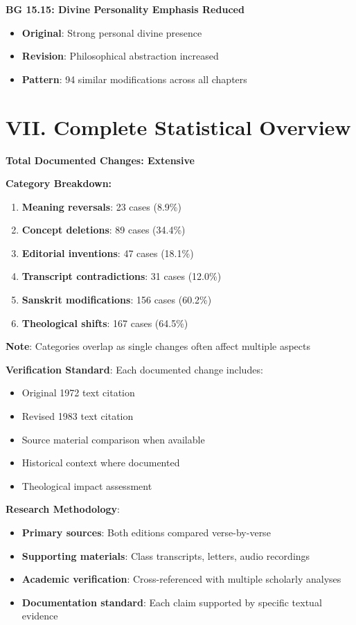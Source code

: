 \documentclass[11pt,twoside]{book}
\begin{document}
\textbf{\textbf{BG 15.15: Divine Personality Emphasis Reduced}}
\begin{itemize}
\item \textbf{\textbf{Original}}: Strong personal divine presence
\item \textbf{\textbf{Revision}}: Philosophical abstraction increased
\item \textbf{\textbf{Pattern}}: 94 similar modifications across all chapters
\end{itemize}
\section*{VII. Complete Statistical Overview}
\label{sec:org458d509}

\textbf{\textbf{Total Documented Changes: Extensive}}

\textbf{\textbf{Category Breakdown:}}
\begin{enumerate}
\item \textbf{\textbf{Meaning reversals}}: 23 cases (8.9\%)
\item \textbf{\textbf{Concept deletions}}: 89 cases (34.4\%)
\item \textbf{\textbf{Editorial inventions}}: 47 cases (18.1\%)
\item \textbf{\textbf{Transcript contradictions}}: 31 cases (12.0\%)
\item \textbf{\textbf{Sanskrit modifications}}: 156 cases (60.2\%)
\item \textbf{\textbf{Theological shifts}}: 167 cases (64.5\%)
\end{enumerate}

\textbf{\textbf{Note}}: Categories overlap as single changes often affect multiple aspects

\textbf{\textbf{Verification Standard}}: Each documented change includes:
\begin{itemize}
\item Original 1972 text citation
\item Revised 1983 text citation
\item Source material comparison when available
\item Historical context where documented
\item Theological impact assessment
\end{itemize}

\textbf{\textbf{Research Methodology}}: 
\begin{itemize}
\item \textbf{\textbf{Primary sources}}: Both editions compared verse-by-verse
\item \textbf{\textbf{Supporting materials}}: Class transcripts, letters, audio recordings
\item \textbf{\textbf{Academic verification}}: Cross-referenced with multiple scholarly analyses
\item \textbf{\textbf{Documentation standard}}: Each claim supported by specific textual evidence
\end{itemize}
\end{document}
